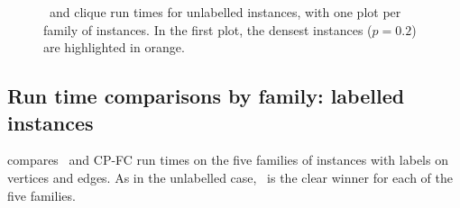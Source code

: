 \begin{figure}[htb]
{        \label{figure:mcsplain-runtime-mcsplitdown-clique-bv}
    }
    \caption{\McSplitDown\ and clique run times for unlabelled instances, with one plot per family of instances.  In the first plot,
            the densest instances ($p=0.2$) are highlighted in orange.}
    \label{figure:mcsplain-runtime-mcsplitdown-clique-scatters}
\end{figure}

\FloatBarrier

\subsection{Run time comparisons by family: labelled instances}

 compares \McSplitDown\ and CP-FC run times
on the five families of instances with labels on vertices and edges.  As in the unlabelled case,
\McSplitDown\ is the clear winner for each of the five families.

